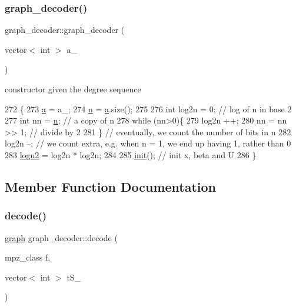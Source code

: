 \subsubsection{\texorpdfstring{graph\+\_\+decoder()}{graph\_decoder()}}
{\footnotesize\ttfamily graph\+\_\+decoder\+::graph\+\_\+decoder (\begin{DoxyParamCaption}\item[{vector$<$ int $>$}]{a\+\_\+ }\end{DoxyParamCaption})}



constructor given the degree sequence 


\begin{DoxyCode}
272 \{
273   \hyperlink{classgraph__decoder_a9dd7c3c11b8a45a12cb7c3c2d2bfa2cc}{a} = a\_;
274   \hyperlink{classgraph__decoder_a6bc1e72b2f7a913d14b789a6c2d92c1e}{n} = \hyperlink{classgraph__decoder_a9dd7c3c11b8a45a12cb7c3c2d2bfa2cc}{a}.size();
275 
276   \textcolor{keywordtype}{int} log2n = 0; \textcolor{comment}{// log of n in base 2}
277   \textcolor{keywordtype}{int} nn = \hyperlink{classgraph__decoder_a6bc1e72b2f7a913d14b789a6c2d92c1e}{n}; \textcolor{comment}{// a copy of n}
278   \textcolor{keywordflow}{while} (nn>0)\{
279     log2n ++;
280     nn = nn >> 1; \textcolor{comment}{// divide by 2}
281   \} \textcolor{comment}{// eventually, we count the number of bits in n}
282   log2n --; \textcolor{comment}{// we count extra, e.g. when n = 1, we end up having 1, rather than 0}
283   \hyperlink{classgraph__decoder_a59663482843ffa5059128bd6ed866f11}{logn2} = log2n * log2n;
284 
285   \hyperlink{classgraph__decoder_a97a9dcd5af21ece86fa91adcb41ca9cc}{init}(); \textcolor{comment}{// init x, beta and U}
286 \}
\end{DoxyCode}


\subsection{Member Function Documentation}
\mbox{\label{classgraph__decoder_a3d2ef81ec6ac66e50c1809f361143922}} 
\subsubsection{\texorpdfstring{decode()}{decode()}}
{\footnotesize\ttfamily \hyperlink{classgraph}{graph} graph\+\_\+decoder\+::decode (\begin{DoxyParamCaption}\item[{mpz\+\_\+class}]{f,  }\item[{vector$<$ int $>$}]{t\+S\+\_\+ }\end{DoxyParamCaption})}



